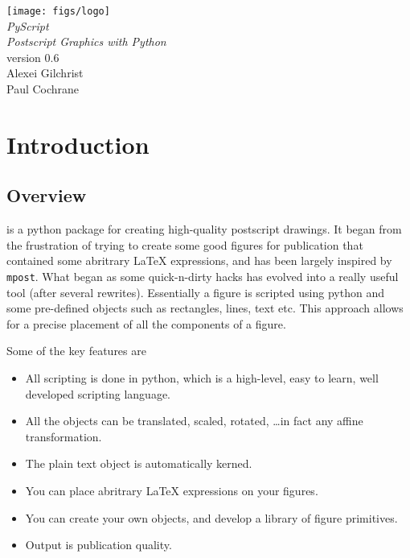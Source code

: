 \documentclass[a4paper]{book}
\begin{document}
\begin{titlepage}
\begin{center}
\vspace*{3cm}
\LARGE

\texttt{[image: figs/logo]}\\[4cm]

{\Huge \emph{PyScript}}\\[1cm]
\emph{Postscript Graphics with Python}\\[2cm]

version 0.6\\[2cm]

Alexei Gilchrist\\
Paul Cochrane
\end{center}
\end{titlepage}

\frontmatter

\tableofcontents

\mainmatter

\chapter{Introduction}
\label{cha:introduction}


\section{Overview}

\pyscript is a python package for creating high-quality postscript
drawings.  It began from the frustration of trying to create some good figures
for publication that contained some abritrary \LaTeX{} expressions, and has
been largely inspired by \Verb|mpost|. What began as some quick-n-dirty hacks
has evolved into a really useful tool (after several rewrites). Essentially a
figure is scripted using python and some pre-defined objects such as
rectangles, lines, text etc. This approach allows for a precise placement of
all the components of a figure.

Some of the key features are
\begin{itemize}
\item All scripting is done in python, which is a high-level, easy to
  learn, well developed scripting language.
\item All the objects can be translated, scaled, rotated, \ldots in fact any
affine transformation.  
\item The plain text object is automatically kerned.
\item You can place abritrary \LaTeX{} expressions on your figures.
\item You can create your own objects, and develop a library of figure 
primitives. 
\item Output is publication quality.
\end{itemize}
\end{document}
